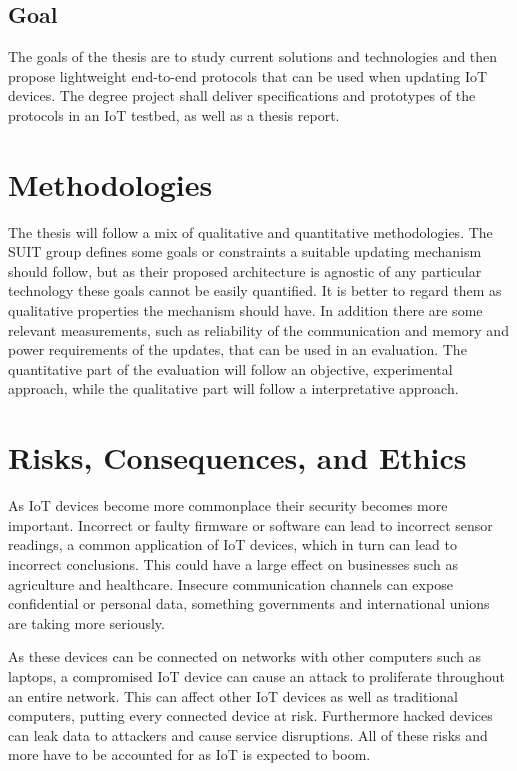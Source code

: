 \documentclass[0-thesis.tex]{subfiles}
\begin{document}
\subsection{Goal}
The goals of the thesis are to study current solutions and technologies and then propose
lightweight end-to-end protocols that can be used when updating IoT devices. The degree
project shall deliver specifications and prototypes of the protocols in an IoT testbed, as
well as a thesis report.

\section{Methodologies}
The thesis will follow a mix of qualitative and quantitative methodologies. The SUIT group
defines some goals or constraints a suitable updating mechanism should follow, but as
their proposed architecture is agnostic of any particular technology these goals cannot be
easily quantified. It is better to regard them as qualitative properties the mechanism
should have. In addition there are some relevant measurements, such as reliability of the
communication and memory and power requirements of the updates, that can be used in an
evaluation. The quantitative part of the evaluation will follow an objective, experimental
approach, while the qualitative part will follow a interpretative approach.

\section{Risks, Consequences, and Ethics}
As IoT devices become more commonplace their security becomes more important. Incorrect or
faulty firmware or software can lead to incorrect sensor readings, a common application of
IoT devices, which in turn can lead to incorrect conclusions. This could have a large
effect on businesses such as agriculture and healthcare. Insecure communication channels
can expose confidential or personal data, something governments and international unions
are taking more seriously. 

As these devices can be connected on networks with other computers such as laptops, a
compromised IoT device can cause an attack to proliferate throughout an entire network.
This can affect other IoT devices as well as traditional computers, putting every
connected device at risk. Furthermore hacked devices can leak data to attackers and cause
service disruptions. All of these risks and more have to be accounted for as IoT is
expected to boom.
\end{document}
